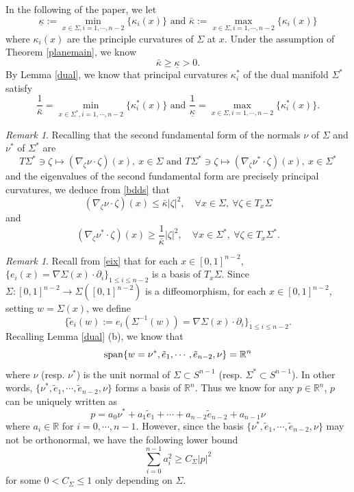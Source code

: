 \documentclass[11pt,a4paper,reqno]{amsart}
\newcommand{\R}{\mathbb{R}}
\newcommand{\1}{\mathbf{1}}
\numberwithin{equation}{section}
\theoremstyle{plain}
\theoremstyle{definition}
\theoremstyle{remark}
\newtheorem{remark}[equation]{Remark}
\begin{document}
In the following of the paper, we let
$$ \underline\kappa:= \min_{x \in \Sigma,i =1,\cdots, n-2}\{\kappa_i(x)\} \mbox{ and } \bar\kappa:= \max_{x \in \Sigma,i =1,\cdots, n-2}\{\kappa_i(x)\} $$
where $\kappa_i(x)$ are the principle curvatures of $\Sigma$ at $x$.
Under the assumption of Theorem \ref{planemain}, we know
$$\bar\kappa \ge \underline\kappa >0.$$
By Lemma \ref{dual}, we know that principal curvatures $\kappa_i^\ast$ of the dual manifold $\Sigma^\ast$ satisfy
\begin{equation}\label{bdds}
  \frac1{\bar\kappa}= \min_{x \in \Sigma^\ast,i =1,\cdots, n-2}\{\kappa_i^\ast(x)\} \mbox{ and } \frac1{\underline\kappa}= \max_{x \in \Sigma,i =1,\cdots, n-2}\{\kappa_i^\ast(x)\}.
\end{equation}

\begin{remark} \label{remII}
    Recalling that the second fundamental form of the normals $\nu$ of $\Sigma$ and $\nu^\ast$ of $\Sigma^\ast$ are
    $$ T\Sigma^\ast \ni \zeta \mapsto (\nabla_\zeta \nu \cdot \zeta)(x), \ x \in \Sigma \mbox{ and } T\Sigma^\ast \ni \zeta \mapsto (\nabla_\zeta \nu^\ast \cdot \zeta)(x), \ x\in \Sigma^\ast$$
    and the eigenvalues of the second fundamental form are precisely principal curvatures,
    we deduce from \eqref{bdds} that
    \begin{equation}\label{II}
    (\nabla_\zeta \nu \cdot \zeta)(x) \le \bar \kappa|\zeta|^2, \quad \forall x \in \Sigma, \ \forall \zeta \in T_x\Sigma
\end{equation}
and
\begin{equation}\label{IIast}
    (\nabla_\zeta \nu^\ast \cdot \zeta)(x) \ge \frac{1}{\bar \kappa}|\zeta|^2, \quad \forall x \in \Sigma^\ast, \ \forall \zeta \in T_x\Sigma^\ast.
\end{equation}
\end{remark}


\begin{remark}\label{basis}
Recall from \eqref{eix} that for each $x \in [0,1]^{n-2}$, $\{e_i(x)= \nabla\Sigma(x)\cdot\partial_i\}_{1 \le i \le n-2}$ is a basis of $T_x\Sigma$.
   Since $\Sigma:[0,1]^{n-2} \to \Sigma([0,1]^{n-2})$ is a diffeomorphism, for each $x \in [0,1]^{n-2}$, setting $w=\Sigma(x)$, we define
$$  \{\tilde e_i(w):= e_i(\Sigma^{-1}(w))= \nabla \Sigma(x) \cdot \partial_i\}_{1\le i \le n-2}. $$
Recalling Lemma \ref{dual} (b), we know that
\begin{equation*}
  {\rm span}  \{w=\nu^\ast, \tilde e_1, \cdots, \tilde e_{n-2}, \nu\}  = \mathbb{R}^{n}
\end{equation*}
where $\nu$ (resp. $\nu^\ast$) is the unit normal of $\Sigma \subset S^{n-1}$ (resp. $\Sigma^\ast \subset S^{n-1}$). In other words, $\{\nu^\ast, \tilde e_1, \cdots, \tilde e_{n-2}, \nu\}$ forms a basis of $\R^n$. Thus
we know for any $p \in \R^n$, $p$ can be uniquely written as
$$  p =  a_0 \nu^\ast + a_1 \tilde e_1 + \cdots + a_{n-2} \tilde e_{n-2} + a_{n-1} \nu
$$
where $a_i\in \R$ for $i=0, \cdots, n-1$. However, since the basis $\{\nu^\ast, \tilde e_1, \cdots, \tilde e_{n-2}, \nu\}$ may not be orthonormal, we have the following lower bound
$$  \sum_{i=0}^{n-1} a_i^2 \ge C_\Sigma |p|^2  $$
for some $0<C_\Sigma \le 1$ only depending on $\Sigma$.
\end{remark}
\end{document}
